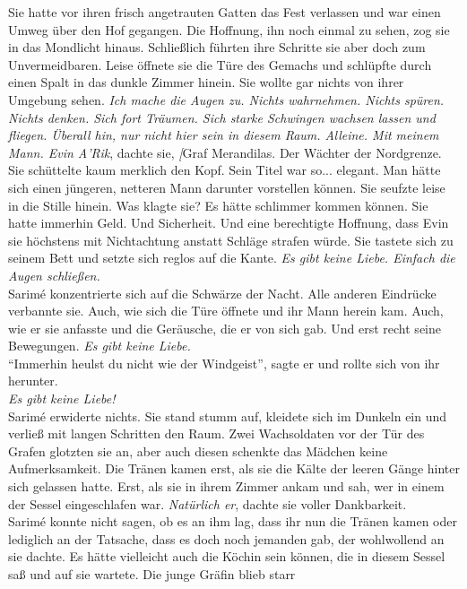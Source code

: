 Sie hatte vor ihren frisch angetrauten Gatten das Fest verlassen und war einen Umweg über den Hof 
gegangen. Die Hoffnung, ihn noch einmal zu sehen, zog sie in das Mondlicht hinaus. Schließlich 
führten ihre Schritte sie aber doch zum Unvermeidbaren. Leise öffnete sie die Türe des Gemachs und 
schlüpfte durch einen Spalt in das dunkle Zimmer hinein. Sie wollte gar nichts von ihrer Umgebung 
sehen. \textit{Ich mache die Augen zu. Nichts wahrnehmen. Nichts spüren. Nichts denken. Sich fort 
Träumen. Sich starke Schwingen wachsen lassen und fliegen. Überall hin, nur nicht hier sein in 
diesem Raum. Alleine. Mit meinem Mann. Evin A'Rik}, dachte sie, \textit[{Graf Merandilas. Der 
Wächter der Nordgrenze.}\\
Sie schüttelte kaum merklich den Kopf. Sein Titel war so... elegant. Man hätte sich einen jüngeren, 
netteren Mann darunter vorstellen können. Sie seufzte leise in die Stille hinein. Was klagte sie? 
Es hätte schlimmer kommen können. Sie hatte immerhin Geld. Und Sicherheit. Und eine berechtigte 
Hoffnung, dass Evin sie höchstens mit Nichtachtung anstatt Schläge strafen würde. Sie tastete sich 
zu seinem Bett und setzte sich reglos auf die Kante. \textit{Es gibt keine Liebe. Einfach die Augen 
schließen.}\\
Sarimé konzentrierte sich auf die Schwärze der Nacht. Alle anderen Eindrücke verbannte sie. Auch, 
wie sich die Türe öffnete und ihr Mann herein kam. Auch, wie er sie anfasste und die Geräusche, die 
er von sich gab. Und erst recht seine Bewegungen. \textit{Es gibt keine Liebe.}\\
``Immerhin heulst du nicht wie der Windgeist'', sagte er und rollte sich von ihr herunter.\\
\textit{Es gibt keine Liebe!}\\
Sarimé erwiderte nichts. Sie stand stumm auf, kleidete sich im Dunkeln ein und verließ mit langen 
Schritten den Raum. Zwei Wachsoldaten vor der Tür des Grafen glotzten sie an, aber auch diesen 
schenkte das Mädchen keine Aufmerksamkeit. Die Tränen kamen erst, als sie die Kälte der leeren 
Gänge hinter sich gelassen hatte. Erst, als sie in ihrem Zimmer ankam und sah, wer in einem der 
Sessel eingeschlafen war. \textit{Natürlich er}, dachte sie voller Dankbarkeit.\\
Sarimé konnte nicht sagen, ob es an ihm lag, dass ihr nun die Tränen kamen oder lediglich an der 
Tatsache, dass es doch noch jemanden gab, der wohlwollend an sie dachte. Es hätte vielleicht auch 
die Köchin sein können, die in diesem Sessel saß und auf sie wartete. Die junge Gräfin blieb starr 
